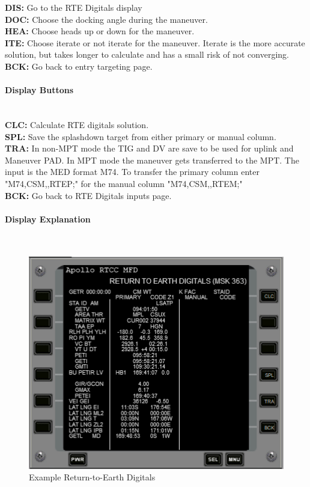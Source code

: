 \documentclass[11pt]{article} %
\begin{document}
\textbf{DIS:} Go to the RTE Digitals display\\
\textbf{DOC:} Choose the docking angle during the maneuver.\\
\textbf{HEA:} Choose heads up or down for the maneuver.\\
\textbf{ITE:} Choose iterate or not iterate for the maneuver. Iterate is the more accurate solution, but takes longer to calculate and has a small risk of not converging.\\
\textbf{BCK:} Go back to entry targeting page.\\
\paragraph{Display Buttons}\mbox{} \\

\textbf{CLC:} Calculate RTE digitals solution.\\
\textbf{SPL:} Save the splashdown target from either primary or manual column.\\
\textbf{TRA:} In non-MPT mode the TIG and DV are save to be used for uplink and Maneuver PAD. In MPT mode the maneuver gets transferred to the MPT. The input is the MED format M74. To transfer the primary column enter "M74,CSM,,RTEP;" for the manual column "M74,CSM,,RTEM;"\\
\textbf{BCK:} Go back to RTE Digitals inputs page.\\
\newpage
\paragraph{Display Explanation}\mbox{} \\

\begin{figure}[hp]
	\centering
		\includegraphics{./ApolloRTCCMFDFiles/Apollo11TEIRTEDExample.png}
	\caption{Example Return-to-Earth Digitals}
	\label{fig:Apollo11TEIRTEDExample}
\end{figure}
\end{document}
